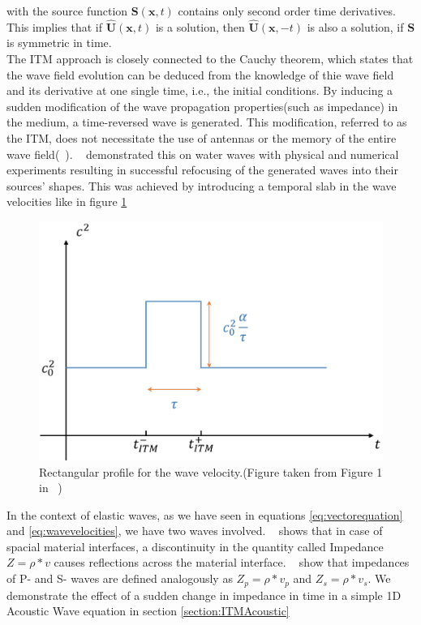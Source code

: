 with the source function $\mathbf{S}\left(\mathbf{x},t\right)$ contains only second order time derivatives. This implies that if $\hat{\mathbf{U}}\left(\mathbf{x},t\right)$
is a solution, then $\hat{\mathbf{U}}\left(\mathbf{x}, -t\right)$ is also a solution, if $\mathbf{S}$ is symmetric in time. \\

The \ac{ITM} approach is closely connected to the Cauchy theorem, which states that the wave field evolution can be deduced from the knowledge of thie wave field
and its derivative at one single time, i.e., the initial conditions. By inducing a sudden modification of the wave propagation properties(such as impedance) in the
medium, a time-reversed wave is generated. This modification, referred to as the \ac{ITM}, does not necessitate the use of antennas or the memory of the entire wave
field(~\parencite{Bacot2016}). ~\parencite{Bacot2016} demonstrated this on water waves with physical and numerical experiments resulting in successful refocusing of the generated waves into their
sources' shapes. This was achieved by introducing a temporal slab in the wave velocities like in figure \ref{fig:deltavelocity}

\begin{figure}
    \centering
    \includegraphics[width=0.6\linewidth]{figures/delta_speed.png}
    \caption{Rectangular profile for the wave velocity.(Figure taken from Figure 1 in ~\parencite[Supplementary Material]{Bacot2016})}
    \label{fig:deltavelocity}
\end{figure}

In the context of elastic waves, as we have seen in equations \ref{eq:vectorequation} and \ref{eq:wavevelocities}, we have two waves involved. 
~\parencite[Sec 9.6-Sec 9.8]{leveque_2002} shows that in case of spacial material interfaces, a discontinuity in the quantity called Impedance $Z = \rho * v$
causes reflections across the material interface. ~\parencite[Eq. 1.66 and 1.180]{kaufman} show that impedances of P- and S- waves are defined analogously as
$Z_p = \rho * v_p$ and $Z_s = \rho * v_s$. We demonstrate the effect of a sudden change in impedance in time in a simple 1D Acoustic Wave equation in section \ref{section:ITMAcoustic}

